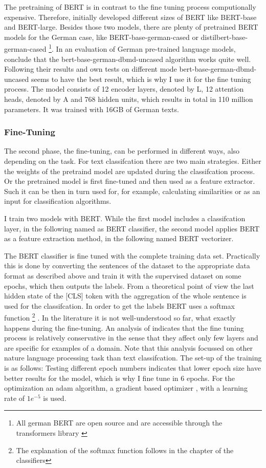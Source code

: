 \documentclass[12pt, a4paper, titlepage]{article}
\begin{document}
The pretraining of \ac{BERT} is in contrast to the fine tuning process computionally expensive. Therefore, \citet{devlin2018} initially developed different sizes of \ac{BERT} like \ac{BERT}-base and \ac{BERT}-large. Besides those two models, there are plenty of pretrained \ac{BERT} models for the German case, like \ac{BERT}-base-german-cased or distilbert-base-german-cased \footnote{All german \ac{BERT} are open source and are accessible through the transformers library \citep{wolf2020}}. In an evaluation of German pre-trained language models, \citep{assenmacher2021} conclude that the bert-base-german-dbmd-uncased algorithm works quite well. Following their results and own tests on different mode bert-base-german-dbmd-uncased seems to have the best result, which is why I use it for the fine tuning process. The model consists of 12 encoder layers, denoted by L, 12 attention heads, denoted by A and 768 hidden units, which results in total in 110 million parameters. It was trained with 16GB of German texts. 

\subsubsection*{Fine-Tuning}
The second phase, the fine-tuning, can be performed in different ways, also depending on the task. For text classifcation there are two main strategies. Either the weights of the pretraind model are updated during the classifcation process. Or the pretrained model is first fine-tuned and then used as a feature extractor.  Such it can be then in turn used for, for example, calculating similarities or as an input for classification algorithms. 

I train two models with \ac{BERT}. While the first model includes a classifcation layer, in the following named as \ac{BERT} classifier, the second model applies \ac{BERT} as a feature extraction method, in the following named \ac{BERT} vectorizer. 

The \ac{BERT} classifier is fine tuned with the complete training data set. Practically this is done by converting the sentences of the dataset to the appropriate data format as described above and train it with the supervised dataset on some epochs, which then outputs  the labels. From a theoretical point of view the last hidden state of the [CLS] token with the aggregation of the whole sentence is used for the classifcation. In order to get the labels \ac{BERT} uses a softmax function \footnote{The explanation of the softmax function follows in the chapter of the classifiers} \citep{sun2019}. In the literature it is not well-understood so far, what exactly happens during the fine-tuning. An analysis of \citet{merchant2020} indicates that the fine tuning process is relatively conservative in the sense that they affect only few layers and are specific for examples of a domain. Note that this analysis focussed on other nature language processing task than text classifcation. The set-up of the training is as follows: Testing different epoch numbers indicates that lower epoch size have better results for the model, which is why I fine tune in 6 epochs. For the optimization an adam algorithm, a gradient based optimizer \citep{kingma2014}, with a learning rate of $1e^{-5}$ is used. 
\end{document}
